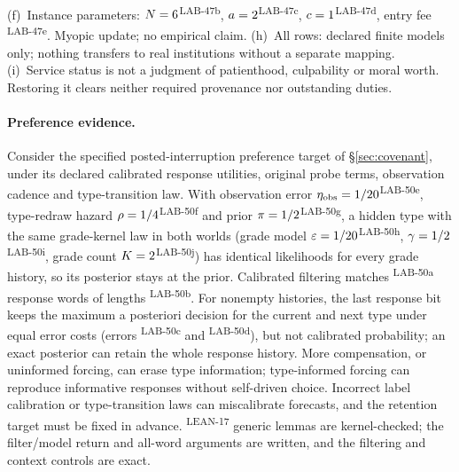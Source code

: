 \documentclass[pdflatex,sn-basic]{sn-jnl}%
\newcommand{\rec}[1]{\ifannotated\textsuperscript{\textcolor{blue!60!black}{\tiny#1}}\fi}
\begin{document}
\begin{appendices}
\begin{table}[tbp]
  \smallskip
  \begin{minipage}{\textwidth}\raggedright\scriptsize
  (f)~Instance parameters: $N = 6$\rec{LAB-47b}, $a = 2$\rec{LAB-47c}, $c = 1$\rec{LAB-47d}, entry fee \numDFourteenEntry\rec{LAB-47e}. Myopic update; no empirical claim.
  (h)~All rows: declared finite models only; nothing transfers to real institutions without a separate mapping.
  (i)~Service status is not a judgment of patienthood, culpability or moral worth. Restoring it clears neither required provenance nor outstanding duties.
  \end{minipage}
\end{table}

\paragraph{Preference evidence.} Consider the specified posted-interruption preference target of \S\ref{sec:covenant}, under its declared calibrated response utilities, original probe terms, observation cadence and type-transition law. With observation error $\eta_{\mathrm{obs}}=1/20$\rec{LAB-50e}, type-redraw hazard $\rho=1/4$\rec{LAB-50f} and prior $\pi=1/2$\rec{LAB-50g}, a hidden type with the same grade-kernel law in both worlds (grade model $\varepsilon=1/20$\rec{LAB-50h}, $\gamma=1/2$\rec{LAB-50i}, grade count $K=2$\rec{LAB-50j}) has identical likelihoods for every grade history, so its posterior stays at the prior. Calibrated filtering matches \numDTwentyThreeWords\rec{LAB-50a} response words of lengths \numDTwentyThreeWordLengths\rec{LAB-50b}. For nonempty histories, the last response bit keeps the maximum a posteriori decision for the current and next type under equal error costs (errors \numDTwentyThreeCurrentErr\rec{LAB-50c} and \numDTwentyThreeNextErr\rec{LAB-50d}), but not calibrated probability; an exact posterior can retain the whole response history. More compensation, or uninformed forcing, can erase type information; type-informed forcing can reproduce informative responses without self-driven choice. Incorrect label calibration or type-transition laws can miscalibrate forecasts, and the retention target must be fixed in advance. \numLeanEvidence\rec{LEAN-17} generic lemmas are kernel-checked; the filter/model return and all-word arguments are written, and the filtering and context controls are exact.


\end{appendices}
\end{document}
